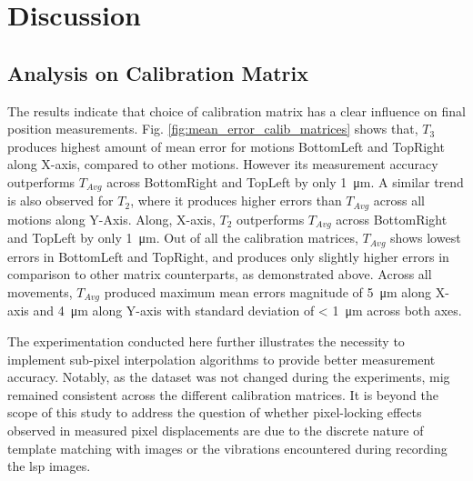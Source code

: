 \chapter{Discussion}\label{chapter:discussion}

\section{Analysis on Calibration Matrix}

    The results indicate that choice of calibration matrix has a clear influence on final position measurements. Fig. \ref{fig:mean_error_calib_matrices} shows that, $T_3$ produces highest amount of mean error for motions \textsf{BottomLeft} and \textsf{TopRight} along X-axis, compared to other motions. However its measurement accuracy outperforms $T_{Avg}$ across \textsf{BottomRight} and \textsf{TopLeft} by only \SI{1}{\micro\meter}. A similar trend is also observed for $T_2$, where it produces higher errors than $T_{Avg}$ across all motions along Y-Axis. Along, X-axis, $T_2$ outperforms $T_{Avg}$ across \textsf{BottomRight} and \textsf{TopLeft} by only \SI{1}{\micro\meter}. Out of all the calibration matrices, $T_{Avg}$ shows lowest errors in \textsf{BottomLeft} and \textsf{TopRight}, and produces only slightly higher errors in comparison to other matrix counterparts, as demonstrated above. Across all movements, $T_{Avg}$ produced maximum mean errors magnitude of \SI{5}{\micro\meter} along X-axis and \SI{4}{\micro\meter} along Y-axis with standard deviation of < \SI{1}{\micro\meter} across both axes.

    \vspace{5mm}
    \noindent The experimentation conducted here further illustrates the necessity to implement sub-pixel interpolation algorithms to provide better measurement accuracy. Notably, as the dataset was not changed during the experiments, \gls{mig} remained consistent across the different calibration matrices. It is beyond the scope of this study to address the question of whether pixel-locking effects observed in measured pixel displacements are due to the discrete nature of template matching with images or the vibrations encountered during recording the \gls{lsp} images.
    
